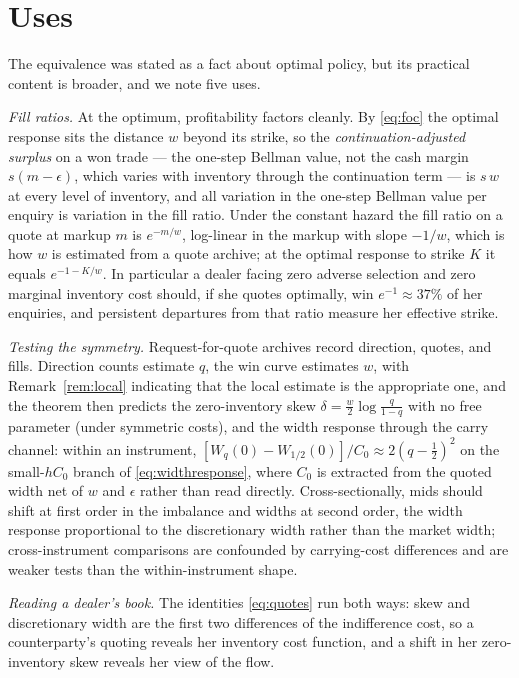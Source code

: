 \documentclass[11pt]{article}
\begin{document}
\section{Uses}\label{sec:uses}

The equivalence was stated as a fact about optimal policy, but its practical content is broader, and we note five uses.

\emph{Fill ratios.} At the optimum, profitability factors cleanly. By \eqref{eq:foc} the optimal response sits the distance $w$ beyond its strike, so the \emph{continuation-adjusted surplus} on a won trade --- the one-step Bellman value, not the cash margin $s(m - \epsilon)$, which varies with inventory through the continuation term --- is $s\,w$ at every level of inventory, and all variation in the one-step Bellman value per enquiry is variation in the fill ratio. Under the constant hazard the fill ratio on a quote at markup $m$ is $e^{-m/w}$, log-linear in the markup with slope $-1/w$, which is how $w$ is estimated from a quote archive; at the optimal response to strike $K$ it equals $e^{-1-K/w}$. In particular a dealer facing zero adverse selection and zero marginal inventory cost should, if she quotes optimally, win $e^{-1} \approx 37\%$ of her enquiries, and persistent departures from that ratio measure her effective strike.

\emph{Testing the symmetry.} Request-for-quote archives record direction, quotes, and fills. Direction counts estimate $q$, the win curve estimates $w$, with Remark~\ref{rem:local} indicating that the local estimate is the appropriate one, and the theorem then predicts the zero-inventory skew $\delta = \tfrac{w}{2}\log\tfrac{q}{1-q}$ with no free parameter (under symmetric costs), and the width response through the carry channel: within an instrument, $[W_q(0) - W_{1/2}(0)]/C_0 \approx 2(q-\tfrac12)^2$ on the small-$hC_0$ branch of \eqref{eq:widthresponse}, where $C_0$ is extracted from the quoted width net of $w$ and $\epsilon$ rather than read directly. Cross-sectionally, mids should shift at first order in the imbalance and widths at second order, the width response proportional to the discretionary width rather than the market width; cross-instrument comparisons are confounded by carrying-cost differences and are weaker tests than the within-instrument shape.

\emph{Reading a dealer's book.} The identities \eqref{eq:quotes} run both ways: skew and discretionary width are the first two differences of the indifference cost, so a counterparty's quoting reveals her inventory cost function, and a shift in her zero-inventory skew reveals her view of the flow.
\end{document}
